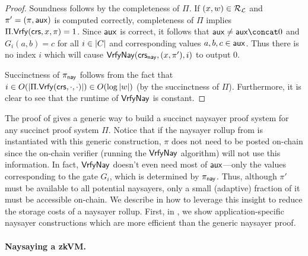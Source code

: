 \begin{proof}
Soundness follows by the completeness of $\Pi$. If $(x,w) \in \mathcal{R}_{\mathcal{L}}$ and $\pi' = (\pi, \mathsf{aux})$ is computed correctly, completeness of $\Pi$ implies $\Pi.\mathsf{Vrfy}(\mathsf{crs}, x, \pi) = 1$. Since $\mathsf{aux}$ is correct, it follows that $\aux \neq \aux \concat 0$ and $G_i(a,b) = c$ for all $i \in \lvert C \rvert$ and corresponding values $a,b,c \in \mathsf{aux}$. Thus there is no index $i$ which will cause ${\mathsf{Vrfy}}\mathsf{Nay}(\mathsf{crs}_{\mathsf{nay}}, (x, \pi'), i)$ to output 0.

Succinctness of $\pi_{\mathsf{nay}}$ follows from the fact that $i \in O(\lvert \Pi.\mathsf{Vrfy}(\mathsf{crs}, \cdot, \cdot) \rvert) \in O(\log{\lvert w \rvert})$ (by the succinctness  of $\Pi$). Furthermore, it is clear to see that the runtime of ${\mathsf{Vrfy}}\mathsf{Nay}$ is constant.
\end{proof}

The proof of  gives a generic way to build a succinct naysayer proof system for any succinct proof system $\Pi$. Notice that if the naysayer rollup from  is instantiated with this generic construction, $\pi$ does not need to be posted on-chain since the on-chain verifier (running the ${\mathsf{Vrfy}}\mathsf{Nay}$ algorithm) will not use this information. In fact, ${\mathsf{Vrfy}}\mathsf{Nay}$ doesn't even need most of $\mathsf{aux}$---only the values corresponding to the gate $G_i$, which is determined by $\pi_{\mathsf{nay}}$. Thus, although $\pi'$ must be available to all potential naysayers, only a small (adaptive) fraction of it must be accessible on-chain. We describe in  how to leverage this insight to reduce the storage costs of a naysayer rollup. First, in , we show application-specific naysayer constructions which are more efficient than the generic naysayer proof.

\paragraph{Naysaying a zkVM.} 

